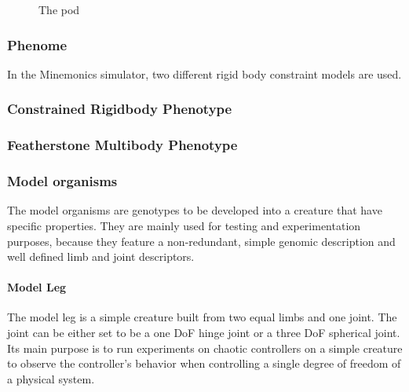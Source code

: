 \documentclass[main]{subfiles}
\begin{document}


\begin{figure}[!h]
\centering
{}
\caption{The pod}
\label{figure:pod}
\end{figure}



\subsubsection{Phenome}

In the Minemonics simulator, two different rigid body constraint models are used. 

\subsubsection{Constrained Rigidbody Phenotype}

\lipsum[10]

\subsubsection{Featherstone Multibody Phenotype}

\lipsum[11]


\subsubsection{Model organisms}

The model organisms are genotypes to be developed into a creature that have specific properties. They are mainly used for testing and experimentation purposes, because they feature a non-redundant, simple genomic description and well defined limb and joint descriptors.

\paragraph{Model Leg}

The model leg is a simple creature built from two equal limbs and one joint. The joint can be either set to be a one DoF hinge joint or a three DoF spherical joint. Its main purpose is to run experiments on chaotic controllers on a simple creature to observe the controller's behavior when controlling a single degree of freedom of a physical system.
\end{document}
